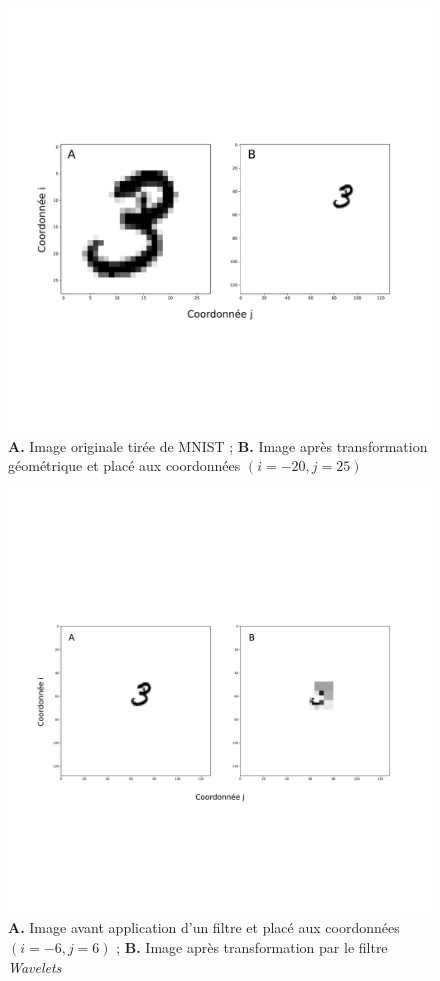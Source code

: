 \begin{figure}[th]
\centering
\includegraphics[scale=0.3]{Figures/mnist_reshape}
\decoRule %
\caption[Figure]{\textbf{A.} Image originale tirée de MNIST ; \textbf{B.} Image après transformation géométrique et placé aux coordonnées $(i=-20,j=25)$}
\label{fig:mnist_reshape}
\end{figure}

\begin{figure}[th]
\centering
\includegraphics[scale=0.25]{Figures/wavelet_effect}
\decoRule %
\caption[Figure]{\textbf{A.} Image avant application d'un filtre et placé aux coordonnées $(i=-6,j=6)$ ; \textbf{B.} Image après transformation par le filtre \textit{Wavelets}}
\label{fig:Wavelet_effect}
\end{figure}

